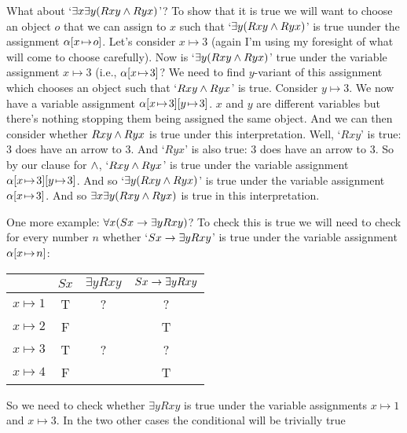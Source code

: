What about `$\exists x \exists y(Rxy \mathbin{\wedge} Ryx)$'? To show that it is true we will want to choose an object $o$ that we can assign to $x$ such that `$\exists y (Rxy\mathbin{\wedge} Ryx)$' is true uunder the assignment $\alpha[x \!\mapsto\! o]$. Let's consider $x\mapsto 3$ (again I'm using my foresight of what will come to choose carefully). Now is `$\exists y (Rxy\mathbin{\wedge} Ryx)$'  true under the variable assignment $x\mapsto 3$ (i.e., $\alpha[x \!\mapsto\! 3]$? We need to find $y$-variant of this assignment which chooses an object such that `$Rxy\mathbin{\wedge} Ryx$' is true. Consider $y\mapsto 3$. We now have a variable assignment $\alpha[x \!\mapsto\! 3][y \!\mapsto\! 3]$. $x$ and $y$ are different variables but there's nothing stopping them being assigned the same object. And we can then consider whether $Rxy\mathbin{\wedge} Ryx$ is true under this interpretation. Well, `$Rxy$' is true: 3 does have an arrow to 3. And `$Ryx$' is also true: 3 does have an arrow to 3. So by our clause for $\mathbin{\wedge}$, `$Rxy\mathbin{\wedge} Ryx$' is true under the variable assignment $\alpha[x \!\mapsto\! 3][y \!\mapsto\! 3]$. And so `$\exists y(Rxy\mathbin{\wedge} Ryx)$' is true under the variable assignment $\alpha[x \!\mapsto\! 3]$. And so $\exists x\exists y(Rxy\mathbin{\wedge} Ryx)$ is true in this interpretation.

One more example: $\forall x(Sx\rightarrow \exists y Rxy)$? To check this is true we will need to check for every number $n$ whether `$Sx\rightarrow \exists y Rxy$' is true under the variable assignment $\alpha[x \!\mapsto\! n]$: \begin{center}
\begin{tabular}{c|ccc}
&$Sx$&$\exists y Rxy$&$Sx\rightarrow\exists y Rxy$\Bstrut\\\hline\Tstrut
$x\mapsto 1$&T&?&?\\
$x\mapsto 2$&F&&T\\
$x\mapsto 3$&T&?&?\\
$x\mapsto 4$&F&&T
\end{tabular}
\end{center}

So we need to check  whether $\exists y Rxy$ is true under the variable assignments $x\mapsto 1$ and $x\mapsto 3$. In the two other cases the conditional will be trivially true

